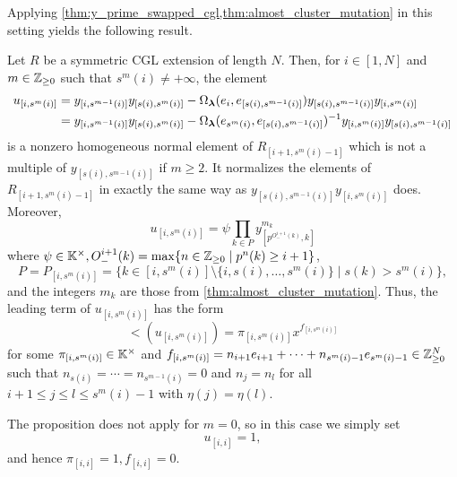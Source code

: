 Applying \cref{thm:y_prime_swapped_cgl,thm:almost_cluster_mutation} in this setting
yields the following result.
\begin{proposition}\label{prop:def_u_brackets}
	Let $R$ be a symmetric CGL extension of length $N$. Then, for $i\in [1, N]$ and $m \in \mathbb{Z}_{\geq 0}$ such that $s^m(i) \neq + \infty$, the element
	\begin{align*}
		u_{[i, s^m(i)]} & = y_{[i, s^{m-1}(i)]}y_{[s(i), s^m(i)]} - \Omega_{\boldsymbol{\lambda}}(e_i, e_{[s(i), s^{m-1}(i)]})y_{[s(i), s^{m-1}(i)]}y_{[i, s^m(i)]}             \\
		                & = y_{[i, s^{m-1}(i)]}y_{[s(i), s^m(i)]} - \Omega_{\boldsymbol{\lambda}}(e_{s^m(i)}, e_{[s(i), s^{m-1}(i)]})^{-1} y_{[i, s^m(i)]}y_{[s(i), s^{m-1}(i)]}
	\end{align*}
	is a nonzero homogeneous normal element of $R_{[i+1, s^m(i) - 1]}$ which is not a
	multiple of $y_{[s(i), s^{m-1}(i)]}$ if $m \geq 2$. It normalizes the elements of
	$R_{[i+1, s^m(i) - 1]}$ in exactly the same way as $y_{[s(i),
						s^{m-1}(i)]}y_{[i,s^m(i)]}$ does. Moreover,
	\begin{equation*}
		u_{[i, s^m(i)]} = \psi \prod_{k \in P} y^{m_k}_{[p^{O_{-}^{i+1}(k)}, k]}
	\end{equation*}
	where $\psi \in \mathbb{K}^\times, O^{i+1}_{-}(k) = \max\{n \in \mathbb{Z}_{\geq 0} \mid p^n(k) \geq i + 1\}$,
	\begin{equation*}
		P = P_{[i,s^m (i)]} = \{k \in [i, s^m(i)]\setminus \{i, s(i), \dots, s^m(i)\} \mid s(k) > s^m(i)\},
	\end{equation*}
	and the integers $m_k$ are those from \cref{thm:almost_cluster_mutation}. Thus, the
	leading term of $u_{[i, s^m(i)]}$ has the form
	\begin{equation*}
		\lt (u_{[i, s^m(i)]}) = \pi_{[i, s^m(i)]} x^{f_{[i, s^m(i)]}}
	\end{equation*}
	for some $\pi_{[i, s^m(i)]} \in \mathbb{K}^\times$ and $f_{[i, s^m(i)]} = n_{i+1}e_{i+1} +
		\cdots + n_{s^m(i) -1}e_{s^m(i)-1} \in \mathbb{Z}_{\geq 0}^N$ such that $n_{s(i)} = \cdots =
		n_{s^{m-1}(i)} = 0$ and $n_j = n_l$ for all $i+1 \leq j \leq l \leq s^m(i)-1$ with
	$\eta(j) = \eta(l)$.
\end{proposition}

The proposition does not apply for $m = 0$, so in this case we simply set
\begin{equation*}
	u_{[i, i]} = 1,
\end{equation*}
and hence $\pi_{[i,i]} = 1, f_{[i,i]} = 0$.

